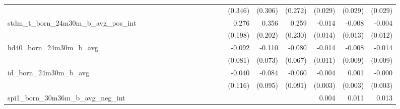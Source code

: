 \begin{tabular}{lrrrrrrrrrrrrrrrrrr}
                                            &              &              &              &              &              &              &              &              &               &              &              &               &      (0.346) &      (0.306) &       (0.272) &      (0.029) &      (0.029) &       (0.029) \\ 
stdm\_t\_born\_24m30m\_b\_avg\_pos\_int     &              &              &              &              &              &              &              &              &               &              &              &               &        0.276 &        0.356 &         0.259 &       -0.014 &       -0.008 &        -0.004 \\ 
                                            &              &              &              &              &              &              &              &              &               &              &              &               &      (0.198) &      (0.202) &       (0.230) &      (0.014) &      (0.013) &       (0.012) \\ 
hd40\_born\_24m30m\_b\_avg                  &              &              &              &              &              &              &              &              &               &              &              &               &       -0.092 &       -0.110 &        -0.080 &       -0.014 &       -0.008 &        -0.014 \\ 
                                            &              &              &              &              &              &              &              &              &               &              &              &               &      (0.081) &      (0.073) &       (0.067) &      (0.011) &      (0.009) &       (0.009) \\ 
id\_born\_24m30m\_b\_avg                    &              &              &              &              &              &              &              &              &               &              &              &               &       -0.040 &       -0.084 &        -0.060 &       -0.004 &        0.001 &        -0.000 \\ 
                                            &              &              &              &              &              &              &              &              &               &              &              &               &      (0.116) &      (0.095) &       (0.091) &      (0.003) &      (0.003) &       (0.003) \\ 
spi1\_born\_30m36m\_b\_avg\_neg\_int        &              &              &              &              &              &              &              &              &               &              &              &               &              &              &               &        0.004 &        0.011 &         0.013 \\ 

\end{tabular}
